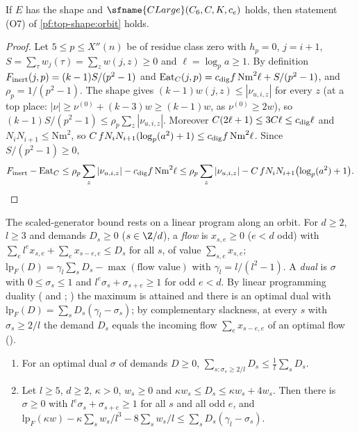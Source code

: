\begin{proposition}\label{pf:top-shape:o7}
If $E$ has the shape and $\sfname{CLarge}(C_6,C,K,c_e)$ holds, then statement (O7) of \cref{pf:top-shape:orbit} holds.
\end{proposition}

\begin{proof}
Let $5\le p\le X''(n)$ be of residue class zero with $h_p=0$, $j=i+1$, $S=\sum_\tau w_j(\tau)=\sum_zw(j,z)\ge0$ and
$\ell=\log_pa\ge1$. By definition $F_{\rm inert}(j,p)=(k-1)S/(p^2-1)$ and
$\mathrm{Eat}_C(j,p)=c_{\rm dig}f\,\mathrm{Nm}^2\ell+S/(p^2-1)$, and $\rho_p=1/(p^2-1)$. The shape gives
$(k-1)w(j,z)\le|\nu_{u,i,z}|$ for every $z$ (at a top place: $|\nu|\ge\nu^{(0)}+(k-3)w\ge(k-1)w$, as $\nu^{(0)}\ge2w$), so
$(k-1)S/(p^2-1)\le\rho_p\sum_z|\nu_{u,i,z}|$. Moreover $C(2\ell+1)\le3C\ell\le c_{\rm dig}\ell$ and $N_iN_{i+1}\le\mathrm{Nm}^2$,
so $C\,fN_iN_{i+1}(\log_p(a^2)+1)\le c_{\rm dig}f\,\mathrm{Nm}^2\ell$. Since $S/(p^2-1)\ge0$,
\[
F_{\rm inert}-\mathrm{Eat}_C\le\rho_p\sum_z|\nu_{u,i,z}|-c_{\rm dig}f\,\mathrm{Nm}^2\ell
\le\rho_p\sum_z|\nu_{u,i,z}|-C\,fN_iN_{i+1}\bigl(\log_p(a^2)+1\bigr).
\qedhere
\]
\end{proof}

The scaled-generator bound rests on a linear program along an orbit. For $d\ge2$, $l\ge3$ and demands $D_s\ge0$
($s\in\Z/d$), a \emph{flow} is $x_{s,e}\ge0$ ($e<d$ odd) with $\sum_el^ex_{s,e}+\sum_ex_{s-e,e}\le D_s$ for all $s$, of value
$\sum_{s,e}x_{s,e}$; $\mathrm{lp}_F(D)=\gamma_l\sum_sD_s-\max(\text{flow value})$ with $\gamma_l=l/(l^2-1)$. A \emph{dual} is
$\sigma$ with $0\le\sigma_s\le1$ and $l^e\sigma_s+\sigma_{s+e}\ge1$ for odd $e<d$. By linear programming duality
( and ;
\cite{Schrijver1986}) the maximum is attained and there is an optimal dual with $\mathrm{lp}_F(D)=\sum_sD_s(\gamma_l-\sigma_s)$;
by complementary slackness, at every $s$ with $\sigma_s\ge2/l$ the demand $D_s$ equals the incoming flow
$\sum_ex_{s-e,e}$ of an optimal flow ().

\begin{lemma}\label{pf:top-shape:lp}
\begin{enumerate}[label=(\alph*)]
\item For an optimal dual $\sigma$ of demands $D\ge0$, $\sum_{s:\sigma_s\ge2/l}D_s\le\frac1l\sum_sD_s$.
\item Let $l\ge5$, $d\ge2$, $\kappa>0$, $w_s\ge0$ and $\kappa w_s\le D_s\le\kappa w_s+4w_s$. Then there is $\sigma\ge0$ with
$l^e\sigma_s+\sigma_{s+e}\ge1$ for all $s$ and all odd $e$, and
$\mathrm{lp}_F(\kappa w)-\kappa\sum_sw_s/l^3-8\sum_sw_s/l\le\sum_sD_s(\gamma_l-\sigma_s)$.
\end{enumerate}
\end{lemma}

